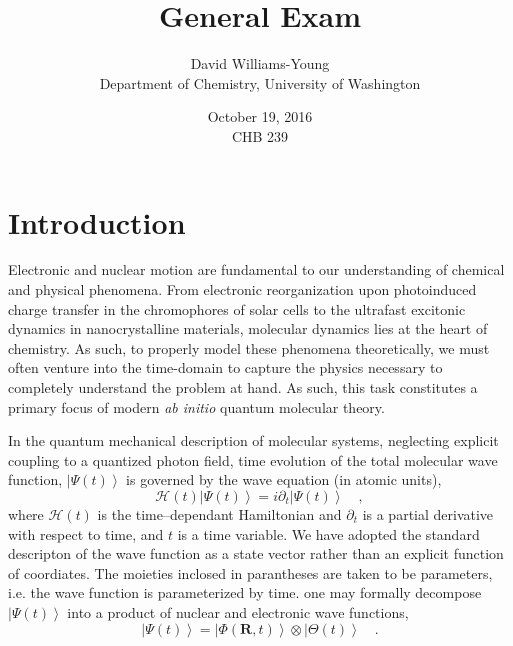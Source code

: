 \documentclass[12pt]{article}
\title{General Exam}
\date{October 19, 2016 \\ CHB 239}
\author{David Williams-Young\\ Department of Chemistry, University of Washington}
\newcommand{\ket}[1]{\left\vert #1 \right\rangle}         %
\newcommand*\vc[1]{\boldsymbol{#1}}
\begin{document}
\maketitle


\newpage
\section{Introduction}

Electronic and nuclear motion are fundamental to our understanding of chemical
and physical phenomena. From electronic reorganization upon photoinduced charge
transfer in the chromophores of solar cells to the ultrafast excitonic dynamics
in nanocrystalline materials, molecular dynamics lies at the heart of chemistry.
As such, to properly model these phenomena theoretically, we must often venture
into the time-domain to capture the physics necessary to completely understand
the problem at hand. As such, this task constitutes a primary focus of modern
\emph{ab initio} quantum molecular theory.

In the quantum mechanical description of molecular systems, neglecting explicit
coupling to a quantized photon field, time evolution of the total molecular wave
function, $\ket{\Psi (t)}$ is governed by the wave equation (in atomic units),
\begin{equation}
\mathscr{H}(t) \ket{\Psi (t)} = i\partial_t \ket{\Psi(t)} \quad,
\label{eq:WaveEq}
\end{equation}
where $\mathscr{H}(t)$ is the time--dependant Hamiltonian and $\partial_t$ is a
partial derivative with respect to time, and $t$ is a time variable. We have
adopted the standard descripton of the wave function as a state vector rather
than an explicit function of coordiates. The moieties inclosed in parantheses
are taken to be parameters, i.e. the wave function is parameterized by time.
one may formally decompose $\ket{\Psi (t)}$ into a product of nuclear and
electronic wave functions,
\begin{equation} 
\ket{\Psi (t)} = \ket{\Phi(\vc{R},t)}\otimes\ket{\Theta(t)} 
\quad .  
\label{eq:exactSepElecNuc}
\end{equation} 
\end{document}
